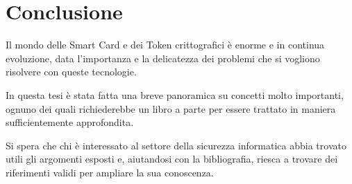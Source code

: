 \chapter*{Conclusione}
\label{epilogue}
Il mondo delle Smart Card e dei Token crittografici è enorme e in continua evoluzione, data l'importanza e la delicatezza dei problemi che si vogliono risolvere con queste tecnologie.

In questa tesi è stata fatta una breve panoramica su concetti molto importanti, ognuno dei quali richiederebbe un libro a parte per essere trattato in maniera sufficientemente approfondita.

Si spera che chi è interessato al settore della sicurezza informatica abbia trovato utili gli argomenti esposti e, aiutandosi con la bibliografia, riesca a trovare dei riferimenti validi per ampliare la sua conoscenza.
